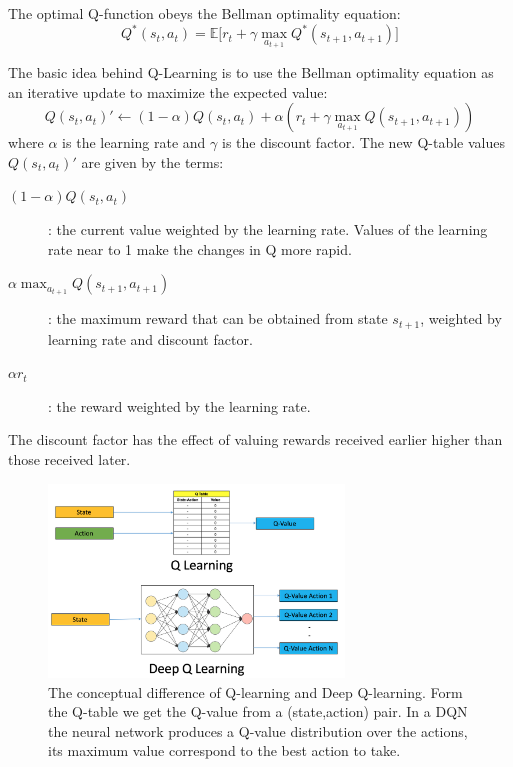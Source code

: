 \documentclass{article}
\begin{document}
 
The optimal Q-function obeys the Bellman optimality equation:
\begin{equation}
    Q^*(s_t,a_t) = \mathbb{E}\big[r_t+\gamma \max_{a_{t+1}} Q^*(s_{t+1},a_{t+1})\big]
\end{equation}

The basic idea behind Q-Learning is to use the Bellman optimality equation as an iterative update to maximize the expected value:
\begin{equation}
    Q(s_t,a_t)'\leftarrow (1-\alpha)Q(s_t,a_t)+\alpha (r_t+\gamma \max_{a_{t+1}} Q(s_{t+1},a_{t+1}))
\end{equation}
where $\alpha$ is the learning rate and $\gamma$ is the discount factor. The new Q-table values $Q(s_t,a_t)'$ are given by the terms:
\begin{description}
\item[$(1-\alpha)Q(s_t,a_t)$]: the current value weighted by the learning rate. Values of the learning rate near to 1 make the changes in 
Q more rapid.
\item[$\alpha\max_{a_{t+1}} Q(s_{t+1},a_{t+1})$]: the maximum reward that can be obtained from state 
$s_{t+1}$, weighted by learning rate and discount factor.
\item[$\alpha r_t$]: the reward weighted by the learning rate.
\end{description}
The discount factor has the effect of valuing rewards received earlier higher than those received later.

\begin{figure}[ht]
    \centering
    \includegraphics[width=0.7\textwidth]{images/q-dqn.png}
    \caption{The conceptual difference of Q-learning and Deep Q-learning. Form the Q-table we get the Q-value from a (state,action) pair. In a DQN the neural network produces a Q-value distribution over the actions, its maximum value correspond to the best action to take.}
    \label{fig:qdqn}
\end{figure}
\end{document}
